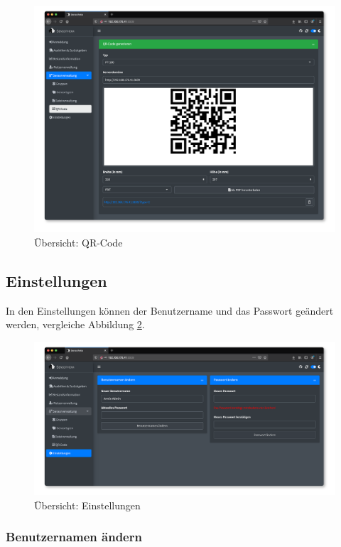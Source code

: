 \documentclass[
]{article}
\begin{document}
\begin{figure}
\centering
\includegraphics{./img/qr_code_overview.png}
\caption{\label{fig:qr-code-overview}Übersicht: QR-Code}
\end{figure}

\hypertarget{settings}{%
\subsection{Einstellungen}\label{settings}}

In den Einstellungen können der Benutzername und das Passwort geändert werden, vergleiche Abbildung \ref{fig:settings-overview}.

\begin{figure}
\centering
\includegraphics{./img/settings_overview.png}
\caption{\label{fig:settings-overview}Übersicht: Einstellungen}
\end{figure}

\hypertarget{benutzernamen-uxe4ndern}{%
\subsubsection{Benutzernamen ändern}\label{benutzernamen-uxe4ndern}}
\end{document}
